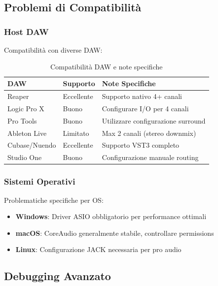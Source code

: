 \documentclass[a4paper,11pt,openany]{book}
\begin{document}
\subsection{Problemi di Compatibilità}

\subsubsection{Host DAW}

Compatibilità con diverse DAW:

\begin{table}[H]
    \centering
    \caption{Compatibilità DAW e note specifiche}
    \label{tab:daw_compatibility}
    \begin{tabular}{@{}p{3cm}p{2cm}p{6cm}@{}}
        \toprule
        \textbf{DAW} & \textbf{Supporto} & \textbf{Note Specifiche} \\
        \midrule
        Reaper & Eccellente & Supporto nativo 4+ canali \\
        Logic Pro X & Buono & Configurare I/O per 4 canali \\
        Pro Tools & Buono & Utilizzare configurazione surround \\
        Ableton Live & Limitato & Max 2 canali (stereo downmix) \\
        Cubase/Nuendo & Eccellente & Supporto VST3 completo \\
        Studio One & Buono & Configurazione manuale routing \\
        \bottomrule
    \end{tabular}
\end{table}

\subsubsection{Sistemi Operativi}

Problematiche specifiche per OS:

\begin{itemize}
    \item \textbf{Windows}: Driver ASIO obbligatorio per performance ottimali
    \item \textbf{macOS}: CoreAudio generalmente stabile, controllare permissions
    \item \textbf{Linux}: Configurazione JACK necessaria per pro audio
\end{itemize}

\subsection{Debugging Avanzato}
\end{document}
